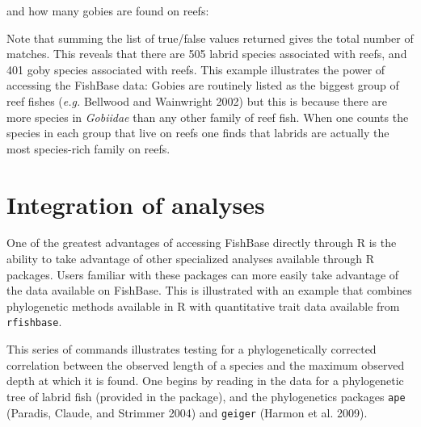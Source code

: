 \begin{Shaded}
\begin{Highlighting}[]
\NormalTok{(}\NormalTok{, }
\end{Highlighting}
\end{Shaded}
and how many gobies are found on reefs:

\begin{Shaded}
\begin{Highlighting}[]
\NormalTok{(}\NormalTok{(}\NormalTok{, }
\end{Highlighting}
\end{Shaded}
Note that summing the list of true/false values returned gives the total
number of matches. This reveals that there are 505 labrid species
associated with reefs, and 401 goby species associated with reefs. This
example illustrates the power of accessing the FishBase data: Gobies are
routinely listed as the biggest group of reef fishes (\emph{e.g.}
Bellwood and Wainwright 2002) but this is because there are more species
in \emph{Gobiidae} than any other family of reef fish. When one counts
the species in each group that live on reefs one finds that labrids are
actually the most species-rich family on reefs.

\section{Integration of analyses}

One of the greatest advantages of accessing FishBase directly through R
is the ability to take advantage of other specialized analyses available
through R packages. Users familiar with these packages can more easily
take advantage of the data available on FishBase. This is illustrated
with an example that combines phylogenetic methods available in R with
quantitative trait data available from \texttt{rfishbase}.

This series of commands illustrates testing for a phylogenetically
corrected correlation between the observed length of a species and the
maximum observed depth at which it is found. One begins by reading in
the data for a phylogenetic tree of labrid fish (provided in the
package), and the phylogenetics packages \texttt{ape} (Paradis, Claude,
and Strimmer 2004) and \texttt{geiger} (Harmon et al. 2009).

